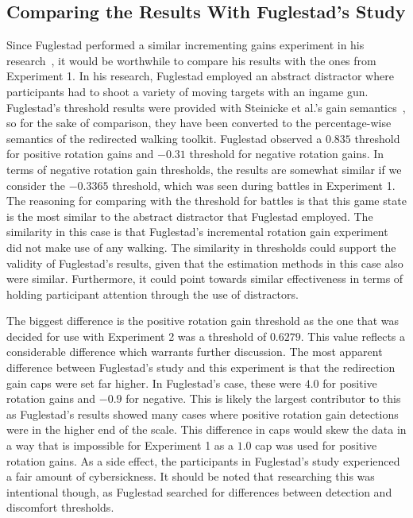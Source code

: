 \subsection{Comparing the Results With Fuglestad's Study}
Since Fuglestad performed a similar incrementing gains experiment in his research~\cite{fuglestad2018redirected}, it would be worthwhile to compare his results with the ones from Experiment 1. In his research, Fuglestad employed an abstract distractor where participants had to shoot a variety of moving targets with an ingame gun. Fuglestad's threshold results were provided with Steinicke et al.'s gain semantics~\cite{5072212}, so for the sake of comparison, they have been converted to the percentage-wise semantics of the redirected walking toolkit. Fuglestad observed a $0.835$ threshold for positive rotation gains and $-0.31$ threshold for negative rotation gains. In terms of negative rotation gain thresholds, the results are somewhat similar if we consider the $-0.3365$ threshold, which was seen during battles in Experiment 1. The reasoning for comparing with the threshold for battles is that this game state is the most similar to the abstract distractor that Fuglestad employed. The similarity in this case is that Fuglestad's incremental rotation gain experiment did not make use of any walking. The similarity in thresholds could support the validity of Fuglestad's results, given that the estimation methods in this case also were similar. Furthermore, it could point towards similar effectiveness in terms of holding participant attention through the use of distractors. 

The biggest difference is the positive rotation gain threshold as the one that was decided for use with Experiment 2 was a threshold of $0.6279$. This value reflects a considerable difference which warrants further discussion. The most apparent difference between Fuglestad's study and this experiment is that the redirection gain caps were set far higher. In Fuglestad's case, these were $4.0$ for positive rotation gains and $-0.9$ for negative. This is likely the largest contributor to this as Fuglestad's results showed many cases where positive rotation gain detections were in the higher end of the scale. This difference in caps would skew the data in a way that is impossible for Experiment 1 as a $1.0$ cap was used for positive rotation gains. As a side effect, the participants in Fuglestad's study experienced a fair amount of cybersickness. It should be noted that researching this was intentional though, as Fuglestad searched for differences between detection and discomfort thresholds.

